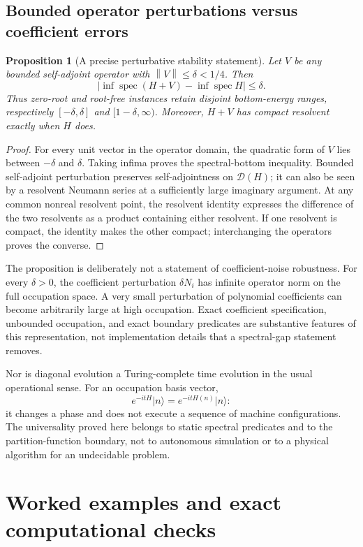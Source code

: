 \documentclass[11pt,letterpaper]{article}
\newtheorem{proposition}[theorem]{Proposition}
\theoremstyle{definition}
\theoremstyle{remark}
\newcommand{\ket}[1]{\lvert #1\rangle}
\newcommand{\abs}[1]{\left\lvert #1\right\rvert}
\newcommand{\norm}[1]{\left\lVert #1\right\rVert}
\DeclareMathOperator{\Spec}{spec}
\begin{document}
\subsection{Bounded operator perturbations versus coefficient errors}
\begin{proposition}[A precise perturbative stability statement]\label{ste:ta:prop:perturb}
Let $V$ be any bounded self-adjoint operator with $\norm V\le\delta<1/4$. Then
\[
\abs{\inf\Spec(H+V)-\inf\Spec H}\le\delta.
\]
Thus zero-root and root-free instances retain disjoint bottom-energy ranges, respectively $[-\delta,\delta]$ and $[1-\delta,\infty)$. Moreover, $H+V$ has compact resolvent exactly when $H$ does.
\end{proposition}
\begin{proof}
For every unit vector in the operator domain, the quadratic form of $V$ lies between $-\delta$ and $\delta$. Taking infima proves the spectral-bottom inequality. Bounded self-adjoint perturbation preserves self-adjointness on $\mathcal D(H)$; it can also be seen by a resolvent Neumann series at a sufficiently large imaginary argument. At any common nonreal resolvent point, the resolvent identity expresses the difference of the two resolvents as a product containing either resolvent. If one resolvent is compact, the identity makes the other compact; interchanging the operators proves the converse.
\end{proof}

The proposition is deliberately not a statement of coefficient-noise robustness. For every $\delta>0$, the coefficient perturbation $\delta N_i$ has infinite operator norm on the full occupation space. A very small perturbation of polynomial coefficients can become arbitrarily large at high occupation. Exact coefficient specification, unbounded occupation, and exact boundary predicates are substantive features of this representation, not implementation details that a spectral-gap statement removes.

Nor is diagonal evolution a Turing-complete time evolution in the usual operational sense. For an occupation basis vector,
\[
e^{-itH}\ket n=e^{-itH(n)}\ket n:
\]
it changes a phase and does not execute a sequence of machine configurations. The universality proved here belongs to static spectral predicates and to the partition-function boundary, not to autonomous simulation or to a physical algorithm for an undecidable problem.

\section{Worked examples and exact computational checks}
\end{document}
